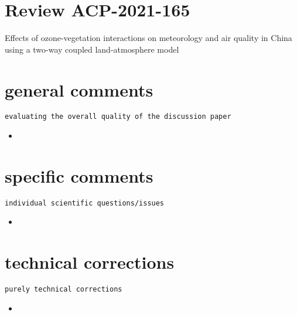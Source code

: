 \documentclass{scrartcl}
\begin{document}
\section*{Review ACP-2021-165}
Effects of ozone-vegetation interactions on meteorology and air quality in China using a two-way coupled land-atmosphere model

\section{general comments}
\texttt{evaluating the overall quality of the discussion paper}\\
\begin{itemize}
  \item

\end{itemize}

\section{specific comments}
\label{sec:spec}
\texttt{individual scientific questions/issues}\\

\begin{itemize}
\item
\end{itemize}


\section{technical corrections}
\label{sec:tec}
\texttt{purely technical corrections}\\

\begin{itemize}
\item 
\end{itemize}
\end{document}
